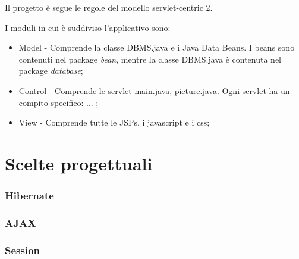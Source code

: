 \documentclass[a4paper,10pt]{report}
\begin{document}
Il progetto \`e segue le regole del modello servlet-centric 2.

I moduli in cui \`e suddiviso l'applicativo sono:
\begin{itemize}
 \item Model - Comprende la classe DBMS.java e i Java Data Beans. I beans sono contenuti nel package \textit{bean}, mentre la classe DBMS.java \`e contenuta nel package \textit{database};
 \item Control - Comprende le servlet main.java, picture.java.  Ogni servlet ha un compito specifico: ... ;
 \item View - Comprende tutte le JSPs, i javascript e i css;
\end{itemize}



\part{Scelte progettuali}

\section{Hibernate}
\section{AJAX}
\section{Session}
\end{document}
